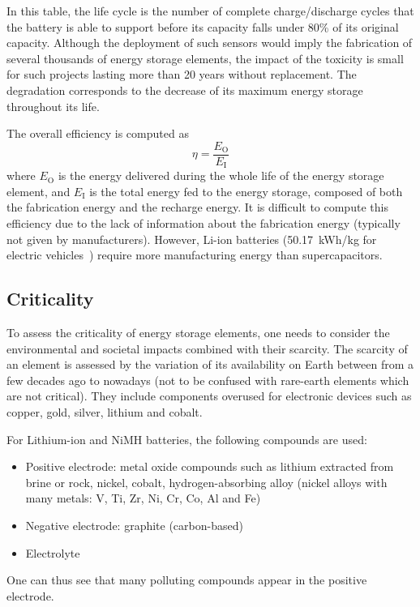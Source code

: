 \documentclass{EPL-master-thesis-covers-EN}
\newcommand{\te}[1]{\textrm{#1}}
\begin{document}
In this table, the life cycle is the number of complete charge/discharge cycles that the battery is able to support before its capacity falls under 80\% of its original capacity.
Although the deployment of such sensors would imply the fabrication of several thousands of energy storage elements, the impact of the toxicity is small for such projects lasting more than 20 years without replacement. The degradation corresponds to the decrease of its maximum energy storage throughout its life.

The overall efficiency is computed as
\[
 \eta = \frac{E_\te{O}}{E_\te{I}}
\]
where $E_\te{O}$ is the energy delivered during the whole life of the energy storage element, and $E_\te{I}$ is the total energy fed to the energy storage, composed of both the fabrication energy and the recharge energy. It is difficult to compute this efficiency due to the lack of information about the fabrication energy (typically not given by manufacturers). However, Li-ion batteries (\SI{50.17}{kWh/kg} for electric vehicles~\cite{manufacturing_lithium}) require more manufacturing energy than supercapacitors.


\subsection*{Criticality}

To assess the criticality of energy storage elements, one needs to consider the environmental and societal impacts combined with their scarcity. The scarcity of an element is assessed by the variation of its availability on Earth between from a few decades ago to nowadays (not to be confused with rare-earth elements which are not critical). They include components overused for electronic devices such as copper, gold, silver, lithium and cobalt.

For Lithium-ion and NiMH batteries, the following compounds are used:
\begin{itemize}
 \item Positive electrode: metal oxide compounds such as lithium extracted from brine or rock, nickel, cobalt, hydrogen-absorbing alloy (nickel alloys with many metals: V, Ti, Zr, Ni, Cr, Co, Al and Fe)
 \item Negative electrode: graphite (carbon-based)
 \item Electrolyte
\end{itemize}

One can thus see that many polluting compounds appear in the positive electrode.
\end{document}
